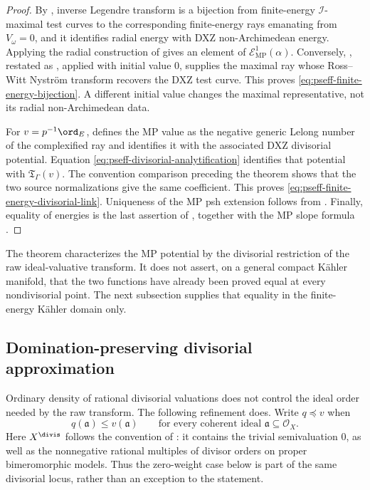 \begin{proof}
By \cite[Theorem~3.17]{DXZ23}, inverse Legendre transform is a bijection
from finite-energy \(\mathcal I\)-maximal test curves to the corresponding
finite-energy rays emanating from \(V_\omega=0\), and it identifies radial
energy with DXZ non-Archimedean energy.  Applying the radial construction
of \cite[Theorem~5.1.4 and Section~5.2]{MP24} gives an element of
\(\mathcal E^1_{\mathrm{MP}}(\alpha)\).  Conversely,
\cite[Theorem~5.1.7]{MP24}, restated as
, applied with initial value \(0\), supplies the
maximal ray whose Ross--Witt Nystr\"om transform recovers the DXZ test
curve.  This proves \eqref{eq:pseff-finite-energy-bijection}.  A different
initial value changes the maximal representative, not its radial
non-Archimedean data.

For \(v=p^{-1}\ord_E\), \cite[Theorem~5.1.4 and Section~5.2]{MP24}
defines the MP value as the negative generic Lelong number of the
complexified ray and identifies it with the associated DXZ divisorial
potential.  Equation \eqref{eq:pseff-divisorial-analytification} identifies
that potential with \(\mathfrak T_\Gamma(v)\).  The convention comparison
preceding the theorem shows that the two source normalizations give the
same coefficient.  This proves
\eqref{eq:pseff-finite-energy-divisorial-link}.  Uniqueness of the MP psh
extension follows from \cite[Theorem~4.3.8]{MP24}.  Finally, equality of
energies is the last assertion of \cite[Theorem~3.17]{DXZ23}, together
with the MP slope formula \cite[Theorem~5.3.4]{MP24}.
\end{proof}

\begin{remark}\label{rem:pseff-finite-energy-raw-function}
The theorem characterizes the MP potential by the divisorial restriction
of the raw ideal-valuative transform.  It does not assert, on a general
compact K\"ahler manifold, that the two functions have already been proved
equal at every nondivisorial point.  The next subsection supplies that
equality in the finite-energy K\"ahler domain only.
\end{remark}

\subsection{Domination-preserving divisorial approximation}

Ordinary density of rational divisorial valuations does not control the
ideal order needed by the raw transform.  The following refinement does.
Write \(q\preceq v\) when
\[
 q(\mathfrak a)\leq v(\mathfrak a)
 \qquad\text{for every coherent ideal }\mathfrak a\subseteq\mathcal O_X.
\tag{71.41a}\label{eq:p143-ideal-order}
\]
Here \(X^{\divis}\) follows the convention of
\cite[Definition~2.3.1]{MP24}: it contains the trivial semivaluation \(0\),
as well as the nonnegative rational multiples of divisor orders on proper
bimeromorphic models.  Thus the zero-weight case below is part of the same
divisorial locus, rather than an exception to the statement.

